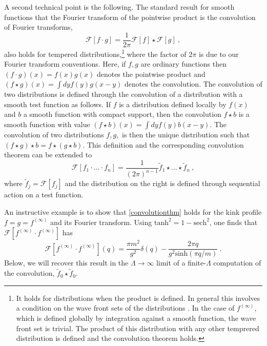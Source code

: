 \def\letter{0}\def\pr{0}\documentclass[a4paper,12pt, epsfig]{article}
\renewcommand{\sinh}{\textrm{sinh}}
\renewcommand{\tanh}{\textrm{tanh}}
\newcommand{\sech}{\textrm{sech}}
\renewcommand{\(}{\begin{equation}}
\renewcommand{\)}{end{equation} \vspace{-.05in}\linebreak}
\renewcommand{\=}{\hspace{-.03in}=\hspace{-.02in}}
\renewcommand{\(}{\begin{equation}}
\renewcommand{\)}{\end{equation}}
\renewcommand{\(}{\begin{equation}}
\renewcommand{\)}{\end{equation}}
\begin{document}
A second technical point is the following.  The standard result for smooth functions that the Fourier transform of the pointwise product is the convolution of Fourier transforms,
%
\begin{equation}\label{convolutionthm}
\mathcal{F}[f \cdot g] = \frac{1}{2\pi} \mathcal{F}[f] \star \mathcal{F}[g]~,
\end{equation}
%
also holds for tempered distributions,\footnote{It holds for distributions when the product is defined.  In general this involves a condition on the wave front sets of the distributions \cite{hormander}.  In the case of $f^{(\infty)}$, which is defined globally by integration against a smooth function, the wave front set is trivial.  The product of this distribution with any other temprered distribution is defined and the convolution theorem holds.} where the factor of $2\pi$ is due to our Fourier transform conventions.  Here, if $f,g$ are ordinary functions then $(f \cdot g)(x) = f(x) g(x)$ denotes the pointwise product and $(f \star g)(x) = \int dy f(y) g(x-y)$ denotes the convolution.  The convolution of two distributions is defined through the convolution of a distribution with a smooth test function as follows.  If $f$ is a distribution defined locally by $f(x)$ and $b$ a smooth function with compact support, then the convolution $f \star b$ is a smooth function with value $(f \star b)(x) = \int dy f(y) b(x-y)$.  The convolution of two distributions $f,g,$ is then the unique distribution such that $(f \star g) \star b = f \star (g \star b)$.  This definition and the corresponding convolution theorem can be extended to
%
\begin{equation}
\mathcal{F}[f_1 \cdot  \ldots \cdot f_n] = \frac{1}{(2\pi)^{n-1}} \tilde{f}_1 \star \ldots \star \tilde{f}_n~,
\end{equation}
%
where $\tilde{f}_j = \mathcal{F}[f_j]$ and the distribution on the right is defined through sequential action on a test function.
%

An instructive example is to show that \eqref{convolutionthm} holds for the kink profile $f = g = f^{(\infty)}$ and its Fourier transform.  Using $\tanh^2 = 1 - \sech^2$, one finds that $\mathcal{F}[f^{(\infty)} \cdot f^{(\infty)}]$ has
%
\begin{equation}\label{fsqFT}
\mathcal{F}[f^{(\infty)}\cdot f^{(\infty)}](q) = \frac{\pi m^2}{g^2} \delta(q) - \frac{2\pi q}{g^2 \sinh(\pi q/m)} ~.
\end{equation}
%
Below, we will recover this result in the $\Lambda \to \infty$ limit of a finite-$\Lambda$ computation of the convolution, $\tilde{f}_0 \star \tilde{f}_0$. 
\end{document}
